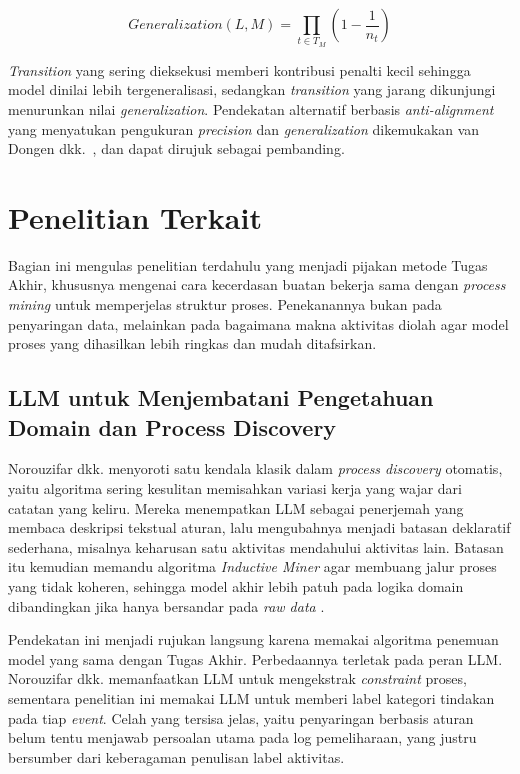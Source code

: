 \begin{equation}
    Generalization(L, M) = \prod_{t \in T_M} \left(1 - \frac{1}{n_t}\right)
    \label{eq:generalization_formula}
\end{equation}

\textit{Transition} yang sering dieksekusi memberi kontribusi penalti kecil sehingga model dinilai lebih tergeneralisasi, sedangkan \textit{transition} yang jarang dikunjungi menurunkan nilai \textit{generalization}. Pendekatan alternatif berbasis \textit{anti-alignment} yang menyatukan pengukuran \textit{precision} dan \textit{generalization} dikemukakan van Dongen dkk.~\cite{vandongen2016unified}, dan dapat dirujuk sebagai pembanding.

\section{Penelitian Terkait}
Bagian ini mengulas penelitian terdahulu yang menjadi pijakan metode Tugas Akhir, khususnya mengenai cara kecerdasan buatan bekerja sama dengan \textit{process mining} untuk memperjelas struktur proses. Penekanannya bukan pada penyaringan data, melainkan pada bagaimana makna aktivitas diolah agar model proses yang dihasilkan lebih ringkas dan mudah ditafsirkan.

\subsection{LLM untuk Menjembatani Pengetahuan Domain dan Process Discovery}
Norouzifar dkk. menyoroti satu kendala klasik dalam \textit{process discovery} otomatis, yaitu algoritma sering kesulitan memisahkan variasi kerja yang wajar dari catatan yang keliru. Mereka menempatkan LLM sebagai penerjemah yang membaca deskripsi tekstual aturan, lalu mengubahnya menjadi batasan deklaratif sederhana, misalnya keharusan satu aktivitas mendahului aktivitas lain. Batasan itu kemudian memandu algoritma \textit{Inductive Miner} agar membuang jalur proses yang tidak koheren, sehingga model akhir lebih patuh pada logika domain dibandingkan jika hanya bersandar pada \textit{raw data} \cite{norouzifar2024}.

Pendekatan ini menjadi rujukan langsung karena memakai algoritma penemuan model yang sama dengan Tugas Akhir. Perbedaannya terletak pada peran LLM. Norouzifar dkk. memanfaatkan LLM untuk mengekstrak \textit{constraint} proses, sementara penelitian ini memakai LLM untuk memberi label kategori tindakan pada tiap \textit{event}. Celah yang tersisa jelas, yaitu penyaringan berbasis aturan belum tentu menjawab persoalan utama pada log pemeliharaan, yang justru bersumber dari keberagaman penulisan label aktivitas.

